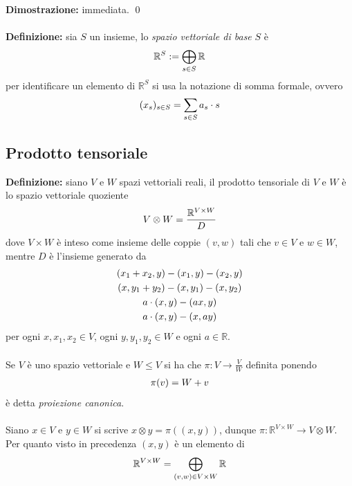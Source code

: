 \documentclass{article}
\begin{document}
\textbf{Dimostrazione:} immediata. \qed \\ \\
\textbf{Definizione:} sia $S$ un insieme, lo \textit{spazio vettoriale di base} $S$ è
\begin{gather}
    \mathbb{R}^S := \bigoplus_{s \in S} \mathbb{R} \notag
\end{gather}
per identificare un elemento di $\mathbb{R}^S$ si usa la notazione di somma formale, ovvero
\begin{gather}
    (x_s)_{s \in S} = \sum_{s \in S} a_s \cdot s \notag
\end{gather}

\newpage
\subsection{Prodotto tensoriale}
\textbf{Definizione:} siano $V$ e $W$ spazi vettoriali reali, il prodotto tensoriale di $V$ e $W$ è lo spazio vettoriale quoziente
\begin{gather}
    V \otimes W = \frac{\mathbb{R}^{V \times W}}{D} \notag
\end{gather}
dove $V \times W$ è inteso come insieme delle coppie $(v, w)$ tali che $v \in V$ e $w \in W$, mentre $D$ è l'insieme generato da
\begin{gather}
    (x_1 + x_2, y) - (x_1, y) - (x_2, y) \notag \\
    (x, y_1 + y_2) - (x, y_1) - (x, y_2) \notag \\
    a \cdot (x, y) - (ax, y) \notag \\
    a \cdot (x, y) - (x, ay) \notag
\end{gather}
per ogni $x, x_1, x_2 \in V$, ogni $y, y_1, y_2 \in W$ e ogni $a \in \mathbb{R}$. \\ \\
Se $V$ è uno spazio vettoriale e $W \leq V$ si ha che $\pi : V \longrightarrow \frac{V}{W}$ definita ponendo
\begin{gather}
    \pi(v) = W + v \notag
\end{gather}
è detta \textit{proiezione canonica}. \\ \\
Siano $x \in V$ e $y \in W$ si scrive $x \otimes y = \pi ((x, y))$, dunque $\pi : \mathbb{R}^{V \times W} \longrightarrow V \otimes W$. \\
Per quanto visto in precedenza $(x, y)$ è un elemento di
\begin{gather}
    \mathbb{R}^{V \times W} = \bigoplus_{(v, w) \in V \times W} \mathbb{R} \notag
\end{gather}
\end{document}
